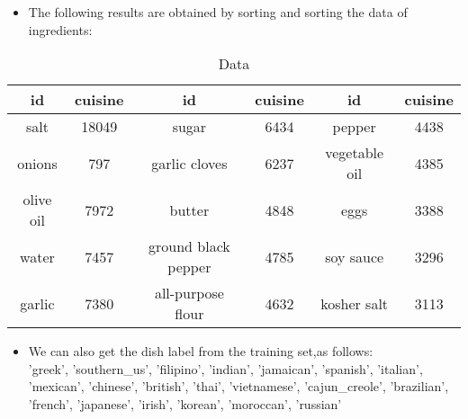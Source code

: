 \documentclass[
 size=14pt,
 paper=smartboard,  %
 mode=present, 		%
 display=slides, 	%
 style=tuliplab,  	%
 pauseslide,
 fleqn,leqno]{powerdot}
\begin{document}
  \begin{slide}[toc=,bm=]{}
    \begin{itemize}
      \item  The following results are obtained by sorting and sorting the data of ingredients:\\
    \end{itemize}

    \begin{table}
      \centering
      \caption{Data}  
  
  
    \begin{tabular}{c c | c c | c c }
      \hline
      id & cuisine & id & cuisine & id & cuisine \\ 
      \hline
      salt & 18049 & sugar & 6434 & pepper & 4438\\
      onions	& 797 & garlic cloves & 6237 & vegetable oil & 4385\\
      olive oil	& 7972 & butter & 4848 & eggs & 3388\\
      water	& 7457 & ground black pepper & 4785 & soy sauce & 3296\\
      garlic	& 7380 & all-purpose flour & 4632 & kosher salt & 3113\\           
      \hline
  
    \end{tabular}
  \end{table}  

\begin{itemize}
  \item  We can also get the dish label from the training set,as follows: \\
  'greek', 'southern_us', 'filipino', 'indian', 'jamaican', 'spanish', 'italian', 'mexican', 'chinese', 'british', 'thai', 'vietnamese', 'cajun_creole', 'brazilian', 'french', 'japanese', 'irish', 'korean', 'moroccan', 'russian'\\
\end{itemize}
    
    \end{slide}





  

\end{document}
